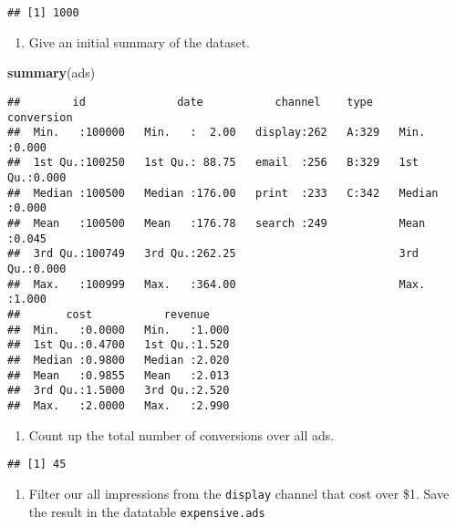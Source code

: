 \documentclass[
]{article}
\newenvironment{Shaded}{\begin{snugshade}}{\end{snugshade}}
\newcommand{\KeywordTok}[1]{\textcolor[rgb]{0.13,0.29,0.53}{\textbf{#1}}}
\newcommand{\NormalTok}[1]{#1}
\newcommand{\OperatorTok}[1]{\textcolor[rgb]{0.81,0.36,0.00}{\textbf{#1}}}
\providecommand{\tightlist}{%
  \setlength{\itemsep}{0pt}\setlength{\parskip}{0pt}}
\begin{document}
\begin{verbatim}
## [1] 1000
\end{verbatim}

\begin{enumerate}
\def\labelenumi{\arabic{enumi}.}
\setcounter{enumi}{5}
\tightlist
\item
  Give an initial summary of the dataset.
\end{enumerate}

\begin{Shaded}
\begin{Highlighting}[]
\KeywordTok{summary}\NormalTok{(ads)}
\end{Highlighting}
\end{Shaded}

\begin{verbatim}
##        id              date           channel    type      conversion   
##  Min.   :100000   Min.   :  2.00   display:262   A:329   Min.   :0.000  
##  1st Qu.:100250   1st Qu.: 88.75   email  :256   B:329   1st Qu.:0.000  
##  Median :100500   Median :176.00   print  :233   C:342   Median :0.000  
##  Mean   :100500   Mean   :176.78   search :249           Mean   :0.045  
##  3rd Qu.:100749   3rd Qu.:262.25                         3rd Qu.:0.000  
##  Max.   :100999   Max.   :364.00                         Max.   :1.000  
##       cost           revenue     
##  Min.   :0.0000   Min.   :1.000  
##  1st Qu.:0.4700   1st Qu.:1.520  
##  Median :0.9800   Median :2.020  
##  Mean   :0.9855   Mean   :2.013  
##  3rd Qu.:1.5000   3rd Qu.:2.520  
##  Max.   :2.0000   Max.   :2.990
\end{verbatim}

\begin{enumerate}
\def\labelenumi{\arabic{enumi}.}
\setcounter{enumi}{6}
\tightlist
\item
  Count up the total number of conversions over all ads.
\end{enumerate}

\begin{Shaded}
\end{Shaded}

\begin{verbatim}
## [1] 45
\end{verbatim}

\begin{enumerate}
\def\labelenumi{\arabic{enumi}.}
\setcounter{enumi}{7}
\tightlist
\item
  Filter our all impressions from the \texttt{display} channel that cost
  over \$1. Save the result in the datatable \texttt{expensive.ads}
\end{enumerate}
\end{document}
